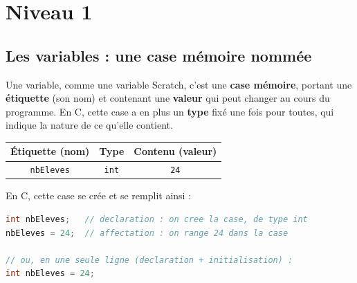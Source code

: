 \section{Niveau 1}

\subsection{Les variables : une case mémoire nommée}

\begin{UPSTIexemples}{}
    Une variable, comme une variable Scratch, c'est une \textbf{case mémoire}, portant une \textbf{étiquette} (son nom) et contenant une \textbf{valeur} qui peut changer au cours du programme. En C, cette case a en plus un \textbf{type} fixé une fois pour toutes, qui indique la nature de ce qu'elle contient.

    \begin{center}
        \begin{tabular}{|c|c|c|}
            \hline
            \textbf{Étiquette (nom)} & \textbf{Type}  & \textbf{Contenu (valeur)} \\
            \hline
            \texttt{nbEleves}        & \texttt{int}   & \texttt{24}               \\
            \hline
        \end{tabular}
    \end{center}

    En C, cette case se crée et se remplit ainsi :
    \begin{lstlisting}[language=C]
int nbEleves;   // declaration : on cree la case, de type int
nbEleves = 24;  // affectation : on range 24 dans la case

// ou, en une seule ligne (declaration + initialisation) :
int nbEleves = 24;
    \end{lstlisting}
\end{UPSTIexemples}

